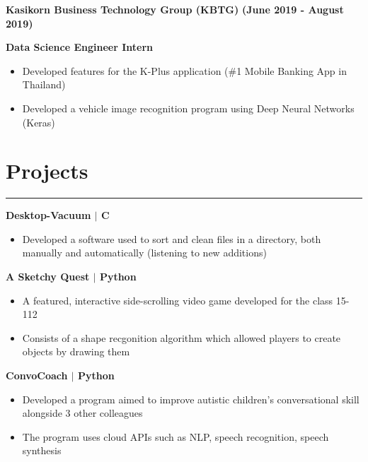 \documentclass[10pt]{article}
\newcommand{\CC}{C\nolinebreak\hspace{-.05em}\raisebox{.4ex}{\tiny\bf +}\nolinebreak\hspace{-.10em}\raisebox{.4ex}{\tiny\bf +}}
\begin{document}
  \textbf{\large Kasikorn Business Technology Group (KBTG)} \hfill \textbf{(June 2019 - August 2019)}

  \textbf{Data Science Engineer Intern}

  \vspace*{-0.25cm}
  \begin{itemize}
    \itemsep-0.13em
    \item Developed features for the K-Plus application (\#1 Mobile Banking App in Thailand)
    \item Developed a vehicle image recognition program using Deep Neural Networks (Keras)
  \end{itemize}

  \vspace*{-0.6cm}
  \section*{\LARGE Projects}
  \vspace*{-0.1cm}
  \hrule depth 0.2mm \relax
  \vspace{0.2cm}

  \textbf{\large Desktop-Vacuum $\mid$ \CC} 
  \vspace*{-0.25cm}
  \begin{itemize}
    \itemsep0em
    \item Developed a software used to sort and clean files in a directory, both manually and automatically (listening to new additions)
  \end{itemize}

  \textbf{\large A Sketchy Quest $\mid$ Python} 
  \vspace*{-0.25cm}
  \begin{itemize}
    \itemsep-0.13em
    \item A featured, interactive side-scrolling video game developed for the class 15-112
    \item Consists of a shape recgonition algorithm which allowed players to create objects by drawing them
  \end{itemize}

  \textbf{\large ConvoCoach $\mid$ Python} 
  \vspace*{-0.25cm}
  \begin{itemize}
    \itemsep-0.13em
    \item Developed a program aimed to improve autistic children's conversational skill alongside 3 other colleagues
    \item The program uses cloud APIs such as NLP, speech recognition, speech synthesis
  \end{itemize}
\end{document}
